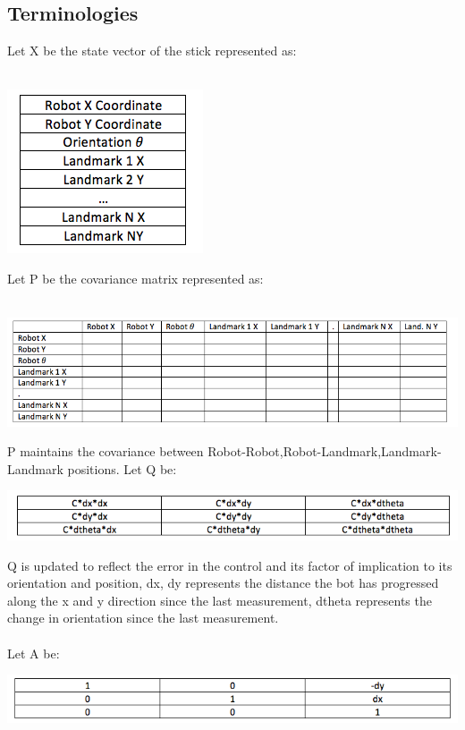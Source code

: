\documentclass[12pt]{article}
\begin{document}
\subsection{Terminologies}
Let X be the state vector of the stick represented as:\\
\\
\begin{center} \includegraphics[scale=0.4]{t1} \end{center}
Let P be the covariance matrix\cite{kalman} represented as:\\
\\
\begin{center} \includegraphics[scale=0.4]{t2} \end{center}
P maintains the covariance between Robot-Robot,Robot-Landmark,Landmark-Landmark positions.
Let Q be:\\
\begin{center} \includegraphics[scale=0.4]{t4} \end{center}
Q is updated to reflect the error in the control and its factor of implication to its orientation and position, dx, dy represents the distance the bot has progressed along the x and y direction since the last measurement, dtheta represents the change in orientation since the last measurement.\\
\\
Let A be:\\
\begin{center} \includegraphics[scale=0.4]{t5} \end{center}
\end{document}
